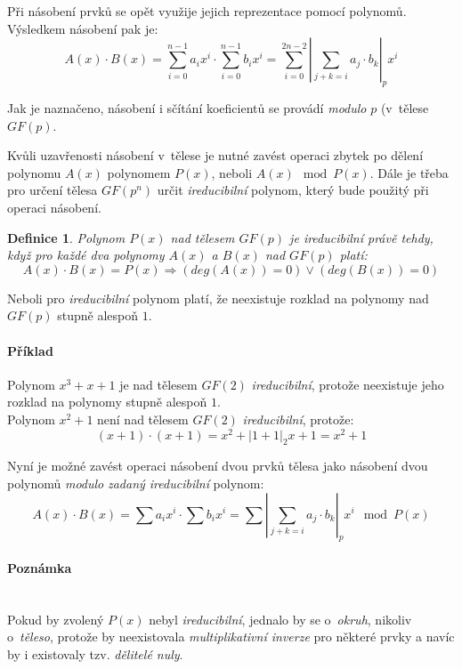 \documentclass[thesis=M,czech,hidelinks]{FITthesis}[2012/06/26]
\newcommand{\0}{{\textcolor[gray]{0.80}{0}}}
\newtheorem{definice}{Definice}
\begin{document}
Při násobení prvků se opět využije jejich reprezentace pomocí polynomů.
Výsledkem násobení pak je:
$$ A(x) \cdot B(x) = \sum_{i=0}^{n-1} a_i x^i \cdot \sum_{i=0}^{n-1} b_i x^i =
\sum_{i=0}^{2n-2} \left|\sum_{j+k=i} a_j \cdot b_k\right|_p x^i$$

Jak je naznačeno, násobení i sčítání koeficientů se provádí \emph{modulo} $p$
(v~tělese $GF(p)$.

Kvůli uzavřenosti násobení v~tělese je nutné zavést operaci zbytek po dělení
polynomu $A(x)$ polynomem $P(x)$, neboli $A(x) \mod P(x)$. Dále je třeba pro
určení tělesa $GF(p^n)$ určit \emph{ireducibilní} polynom, který bude použitý
při operaci násobení.

\begin{definice}
    Polynom $P(x)$ nad tělesem $GF(p)$ je \emph{ireducibilní} právě tehdy, když
    pro každé dva polynomy $A(x)$ a $B(x)$ nad $GF(p)$ platí:
    $$ A(x) \cdot B(x) = P(x) \Rightarrow \left( deg(A(x)) = 0 \right) \lor
    \left( deg(B(x)) = 0 \right)$$
\end{definice}

Neboli pro \emph{ireducibilní} polynom platí, že neexistuje rozklad na polynomy
nad $GF(p)$ stupně alespoň $1$.

\paragraph{Příklad} Polynom $x^3+x+1$ je nad tělesem $GF(2)$ \emph{ireducibilní},
protože neexistuje jeho rozklad na polynomy stupně alespoň $1$. \\
Polynom $x^2+1$ není nad tělesem $GF(2)$ \emph{ireducibilní}, protože:
$$(x+1)\cdot(x+1) = x^2 + \left|1+1\right|_2x + 1 = x^2+1 $$

Nyní je možné zavést operaci násobení dvou prvků tělesa jako násobení dvou
polynomů \emph{modulo} \emph{zadaný ireducibilní} polynom:
$$ A(x) \cdot B(x) = \sum a_i x^i \cdot \sum b_i x^i =
\sum \left|\sum_{j+k=i} a_j \cdot b_k\right|_p x^i \mod P(x) $$


\paragraph{Poznámka} \hfil \\
Pokud by zvolený $P(x)$ nebyl \emph{ireducibilní}, jednalo
by se o~\emph{okruh}, nikoliv o~\emph{těleso}, protože by neexistovala
\emph{multiplikativní inverze} pro některé prvky a navíc by i existovaly
tzv. \emph{dělitelé nuly}.


\end{document}
